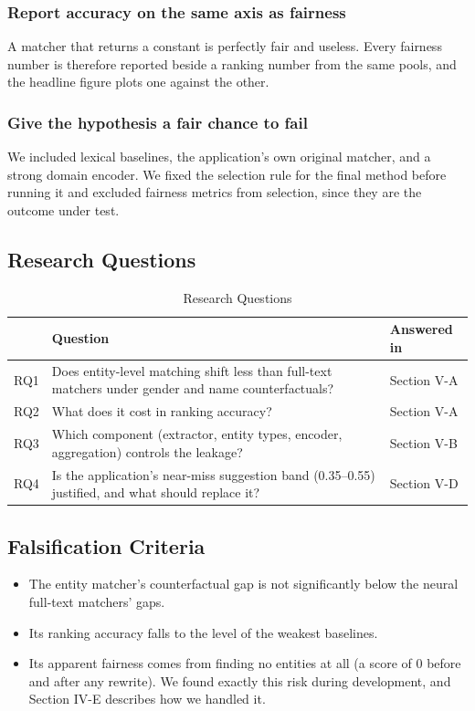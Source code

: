 \documentclass[conference,a4paper]{IEEEtran}
\begin{document}
\subsubsection{Report accuracy on the same axis as fairness} A matcher that returns a constant is perfectly fair and useless. Every fairness number is therefore reported beside a ranking number from the same pools, and the headline figure plots one against the other.

\subsubsection{Give the hypothesis a fair chance to fail} We included lexical baselines, the application's own original matcher, and a strong domain encoder. We fixed the selection rule for the final method before running it and excluded fairness metrics from selection, since they are the outcome under test.

\subsection{Research Questions}
\begin{table}[!t]
\caption{Research Questions}
\label{tab:1}
\centering
\footnotesize
\begin{tabularx}{\columnwidth}{l>{\raggedright\arraybackslash}Xl}
\hline
\textbf{} & \textbf{Question} & \textbf{Answered in} \\
\hline
RQ1 & Does entity-level matching shift less than full-text matchers under gender and name counterfactuals? & Section V-A \\
RQ2 & What does it cost in ranking accuracy? & Section V-A \\
RQ3 & Which component (extractor, entity types, encoder, aggregation) controls the leakage? & Section V-B \\
RQ4 & Is the application's near-miss suggestion band (0.35–0.55) justified, and what should replace it? & Section V-D \\
\hline
\end{tabularx}
\end{table}
\subsection{Falsification Criteria}
\begin{itemize}
\item The entity matcher's counterfactual gap is not significantly below the neural full-text matchers' gaps.
\item Its ranking accuracy falls to the level of the weakest baselines.
\item Its apparent fairness comes from finding no entities at all (a score of 0 before and after any rewrite). We found exactly this risk during development, and Section IV-E describes how we handled it.
\end{itemize}
\end{document}
